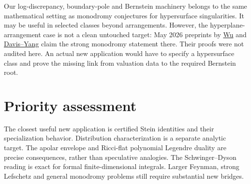 \documentclass[11pt]{article}
\begin{document}
Our log-discrepancy, boundary-pole and Bernstein machinery belongs to the
same mathematical setting as monodromy conjectures for hypersurface
singularities. It may be useful in selected classes beyond arrangements.
However, the hyperplane-arrangement case is not a clean untouched target:
May 2026 preprints by
\href{https://arxiv.org/abs/2605.25335}{Wu} and
\href{https://arxiv.org/abs/2605.25314}{Davis--Yang} claim the strong
monodromy statement there. Their proofs were not audited here.
An actual new application would have to specify a hypersurface class and
prove the missing link from valuation data to the required Bernstein root.

\section{Priority assessment}

The closest useful new application is certified Stein identities and
their specialization behavior. Distribution characterization is a separate
analytic target. The apolar envelope and Ricci-flat polynomial Legendre
duality are precise consequences, rather than speculative analogies.
The Schwinger--Dyson reading is exact for formal finite-dimensional
integrals. Larger Feynman, strong Lefschetz and general monodromy problems
still require substantial new bridges.
\end{document}
